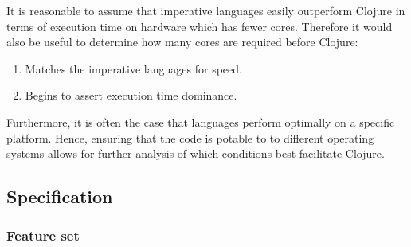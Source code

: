\documentclass[12pt,a4paper]{article}
\begin{document}
It is reasonable to assume that imperative languages easily outperform Clojure in terms of execution time on hardware which has fewer cores. Therefore it would also be useful to determine how many cores are required before Clojure:

\begin{enumerate} \itemsep0pt
    \item Matches the imperative languages for speed.
    \item Begins to assert execution time dominance.
\end{enumerate}

Furthermore, it is often the case that languages perform optimally on a specific platform. Hence, ensuring that the code is potable to to different operating systems allows for further analysis of which conditions best facilitate Clojure.

\newpage
\subsection{Specification}

\subsubsection{Feature set}
\end{document}
